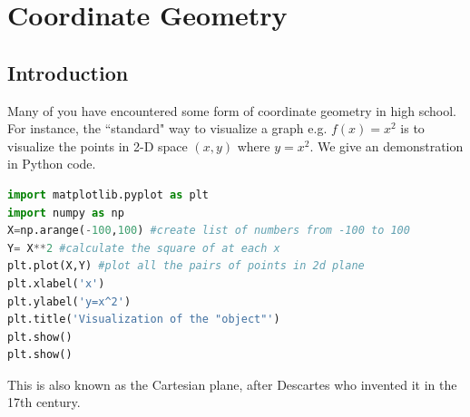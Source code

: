 \chapter{Coordinate Geometry}
\setcounter{exercisecounter}{0}

\setcounter{thmcounter}{1}
\section{Introduction}
Many of you have encountered some form of coordinate geometry in high school. For instance, the ``standard" way to visualize a graph e.g. $f(x)=x^2$ is to visualize the points in 2-D space $(x,y)$ where $y=x^2$. We give an demonstration in Python code.

\begin{lstlisting}[language=Python]
import matplotlib.pyplot as plt
import numpy as np
X=np.arange(-100,100) #create list of numbers from -100 to 100
Y= X**2 #calculate the square of at each x
plt.plot(X,Y) #plot all the pairs of points in 2d plane
plt.xlabel('x')
plt.ylabel('y=x^2')
plt.title('Visualization of the "object"')
plt.show()
plt.show()
\end{lstlisting}


This is also known as the Cartesian plane, after Descartes who invented it in the 17th century.\\
